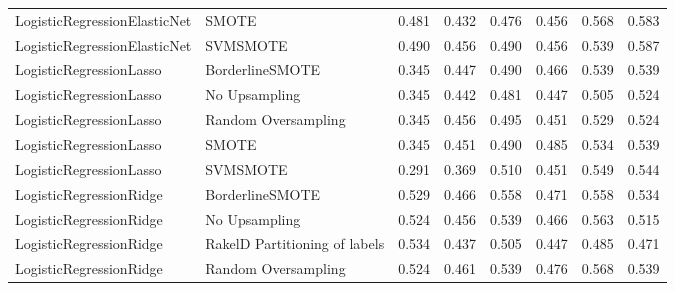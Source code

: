 \begin{tabular}{llllllll}
   LogisticRegressionElasticNet &                         SMOTE & 0.481 &                     0.432 &                 0.476 &                  0.456 &                                   0.568 &     0.583 \\
   LogisticRegressionElasticNet &                      SVMSMOTE & 0.490 &                     0.456 &                 0.490 &                  0.456 &                                   0.539 &     0.587 \\
        LogisticRegressionLasso &               BorderlineSMOTE & 0.345 &                     0.447 &                 0.490 &                  0.466 &                                   0.539 &     0.539 \\
        LogisticRegressionLasso &                 No Upsampling & 0.345 &                     0.442 &                 0.481 &                  0.447 &                                   0.505 &     0.524 \\
        LogisticRegressionLasso &           Random Oversampling & 0.345 &                     0.456 &                 0.495 &                  0.451 &                                   0.529 &     0.524 \\
        LogisticRegressionLasso &                         SMOTE & 0.345 &                     0.451 &                 0.490 &                  0.485 &                                   0.534 &     0.539 \\
        LogisticRegressionLasso &                      SVMSMOTE & 0.291 &                     0.369 &                 0.510 &                  0.451 &                                   0.549 &     0.544 \\
        LogisticRegressionRidge &               BorderlineSMOTE & 0.529 &                     0.466 &                 0.558 &                  0.471 &                                   0.558 &     0.534 \\
        LogisticRegressionRidge &                 No Upsampling & 0.524 &                     0.456 &                 0.539 &                  0.466 &                                   0.563 &     0.515 \\
        LogisticRegressionRidge & RakelD Partitioning of labels & 0.534 &                     0.437 &                 0.505 &                  0.447 &                                   0.485 &     0.471 \\
        LogisticRegressionRidge &           Random Oversampling & 0.524 &                     0.461 &                 0.539 &                  0.476 &                                   0.568 &     0.539 \\

\end{tabular}
